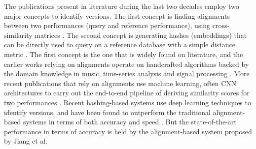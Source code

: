 \documentclass[../main.tex]{subfiles}
\begin{document}
\begin{table}[h]
    \centering
    \caption{Musical changes that can be observed in different version categories}
    \label{tab:musical_changes_cover_songs}
\end{table}

\par
The publications present in literature during the last two decades employ two major concepts to identify versions. The first concept is finding alignments between two performances (query and reference performance), using cross-similarity matrices \cite{gomezSongRemainsSame2006}\cite{footeARTHURRetrievingOrchestral}\cite{serraChromaBinarySimilarity2008}\cite{serraCrossRecurrenceQuantification2009}\cite{jiang_yang_chen_2020}. The second concept is generating hashes (embeddings) that can be directly used to query on a reference database with a simple distance metric \cite{dorasCoverDetectionUsing2019}\cite{yeSupervisedDeepHashing2019b}\cite{yuTemporalPyramidPooling2019}\cite{yesilerAccurateScalableVersion2020}\cite{yesilerLessMoreFaster2020}. The first concept is the one that is widely found on literature, and the earlier works relying on alignments operate on handcrafted algorithms backed by the domain knowledge in music, time-series analysis and signal processing \cite{gomezSongRemainsSame2006}\cite{footeARTHURRetrievingOrchestral}\cite{serraChromaBinarySimilarity2008}\cite{serraCrossRecurrenceQuantification2009}. More recent publications that rely on alignments use machine learning, often \gls{CNN} architectures to carry out the end-to-end pipeline of deriving similarity scores for two performances \cite{jiang_yang_chen_2020}. Recent hashing-based systems use deep learning techniques to identify versions, and have been found to outperform the traditional alignment-based systems in terms of both accuracy and speed \cite{dorasCoverDetectionUsing2019}\cite{yeSupervisedDeepHashing2019b}\cite{yuTemporalPyramidPooling2019}\cite{yesilerAccurateScalableVersion2020}\cite{yesilerLessMoreFaster2020}. But the state-of-the-art performance in terms of accuracy is held by the alignment-based system proposed by Jiang et al. \cite{jiang_yang_chen_2020}
\end{document}
